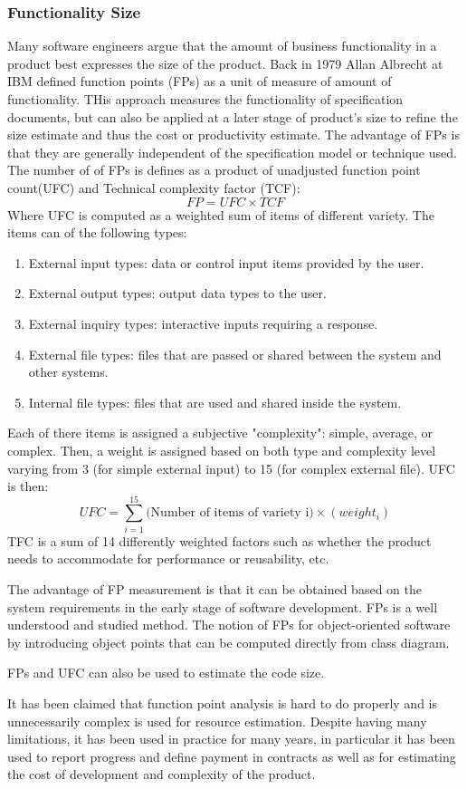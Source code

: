 \documentclass[11pt]{article}
\begin{document}
\subsubsection{Functionality Size}
Many software engineers argue that the amount of business functionality in a product best expresses the size of the product. 
Back in 1979 Allan Albrecht at IBM defined function points (FPs) as a unit of measure of amount of functionality. THis approach measures the functionality of specification documents, but can also be applied at a later stage of product's size to refine the size estimate and thus the cost or productivity estimate. The advantage of FPs is that they are generally independent of the specification model or technique used. The number of of FPs is defines as a product of unadjusted function point count(UFC) and Technical complexity factor (TCF): \[ FP = UFC \times TCF\]
Where UFC is computed as a weighted sum of items of different variety. The items can of the following types\cite{LEUNG-2001}:
\begin{enumerate}
	\item External input types: data or control input items provided by the user.
	\item External output types: output data types to the user.
	\item External inquiry types: interactive inputs requiring a response.
	\item External file types: files that are passed or shared between the system and other systems.
	\item Internal file types: files that are used and shared inside the system.
\end{enumerate}
Each of there items is assigned a subjective "complexity": simple, average, or complex. Then, a weight is assigned based on both type and complexity level varying from 3 (for simple external input) to 15 (for complex external file).
UFC is then: \[UFC=\sum_{i=1}^{15} \text{(Number of items of variety i)} \times (weight_i) \]
TFC is a sum of 14 differently weighted factors such as whether the product needs to accommodate for performance or reusability, etc.
\par
The advantage of FP measurement is that it can be obtained based on the system requirements in the early stage of software development. FPs is a well understood and studied method. The notion of FPs for object-oriented software by introducing object points that can be computed directly from class diagram. 
\par
FPs and UFC can also be used to estimate the code size.
\par
It has been claimed that function point analysis is hard to do properly and is unnecessarily complex is used for resource estimation.\cite{Fenton:1999:SMS:329632.329641} Despite having many limitations, it has been used in practice for many years, in particular it has been used to report progress and define payment in contracts as well as for estimating the cost of development and complexity of the product.
\end{document}

